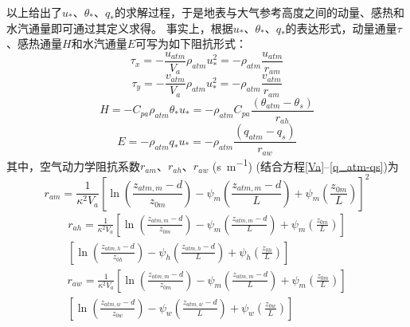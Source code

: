 以上给出了$u_\ast$、$\theta_\ast$、$q_\ast$的求解过程，于是地表与大气参考高度之间的动量、感热和水汽通量即可通过其定义求得。
事实上，根据$u_\ast$、$\theta_\ast$、$q_\ast$的表达形式，动量通量$\tau$、感热通量$H$和水汽通量$E$可写为如下阻抗形式：
\begin{equation}
\tau_{x}=-\frac{u_{atm}}{V_{a}} \rho_{atm} u_{*}^{2}=-\rho_{atm} \frac{u_{atm}}{r_{a m}}
\end{equation}
\begin{equation}
\tau_{y}=-\frac{v_{atm}}{V_{a}} \rho_{atm} u_{*}^{2}=-\rho_{atm} \frac{v_{atm}}{r_{a m}}
\end{equation}
\begin{equation}\label{SH}
H=-C_{p a} \rho_{atm} \theta_{*} u_{*}=-\rho_{atm} C_{p a} \frac{\left(\theta_{atm}-\theta_{s}\right)}{r_{a h}}
\end{equation}
\begin{equation}\label{LH}
E=-\rho_{atm} q_{*} u_{*}=-\rho_{atm} \frac{\left(q_{atm}-q_{s}\right)}{r_{a w}}
\end{equation}
其中，空气动力学阻抗系数$r_{am}$、$r_{ah}$、$r_{aw}$ (\unit{s.m^{-1}}) (结合方程\eqref{Va}--\eqref{q_atm-qs})为
\begin{equation}\label{ram}
r_{a m}=\frac{1}{\kappa^{2} V_{a}}\left[\ln \left(\frac{z_{atm, m}-d}{z_{0 m}}\right)-\psi_{m}\left(\frac{z_{atm, m}-d}{L}\right)+\psi_{m}\left(\frac{z_{0 m}}{L}\right)\right]^{2}
\end{equation}
\begin{equation}\label{rah}
\begin{array}{c}r_{a h}=\frac{1}{\kappa^{2} V_{a}}\left[\ln \left(\frac{z_{atm, m}-d}{z_{0 m}}\right)-\psi_{m}\left(\frac{z_{atm, m}-d}{L}\right)+\psi_{m}\left(\frac{z_{0 m}}{L}\right)\right] \\ {\left[\ln \left(\frac{z_{atm, h}-d}{z_{0 h}}\right)-\psi_{h}\left(\frac{z_{atm, h}-d}{L}\right)+\psi_{h}\left(\frac{z_{0 h}}{L}\right)\right]}\end{array}
\end{equation}
\begin{equation}\label{raw}
\begin{array}{c}r_{a w}=\frac{1}{\kappa^{2} V_{a}}\left[\ln \left(\frac{z_{atm, m}-d}{z_{0 m}}\right)-\psi_{m}\left(\frac{z_{atm, m}-d}{L}\right)+\psi_{m}\left(\frac{z_{0 m}}{L}\right)\right] \\ {\left[\ln \left(\frac{z_{atm, w}-d}{z_{0 w}}\right)-\psi_{w}\left(\frac{z_{atm, w}-d}{L}\right)+\psi_{w}\left(\frac{z_{0 w}}{L}\right)\right]}\end{array}
\end{equation}

